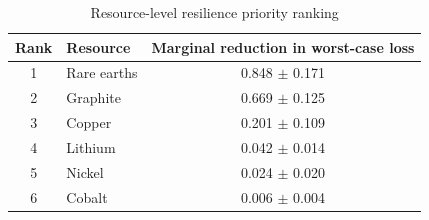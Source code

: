 \begin{table}[htbp]
\centering
\caption{Resource-level resilience priority ranking}
\label{tab:resilience_priority_v7}
\small
\begin{tabular}{clc}
\toprule
Rank & Resource & Marginal reduction in worst-case loss \\
\midrule
1 & Rare earths & 0.848 $\pm$ 0.171 \\
2 & Graphite & 0.669 $\pm$ 0.125 \\
3 & Copper & 0.201 $\pm$ 0.109 \\
4 & Lithium & 0.042 $\pm$ 0.014 \\
5 & Nickel & 0.024 $\pm$ 0.020 \\
6 & Cobalt & 0.006 $\pm$ 0.004 \\
\bottomrule
\end{tabular}
\end{table}